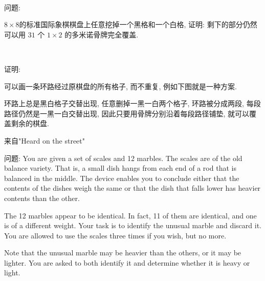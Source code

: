 ~

\noindent 问题:

$8\times 8$的标准国际象棋棋盘上任意挖掉一个黑格和一个白格, 证明: 剩下的部分仍然可以用 $ 31 $ 个 $ 1\times 2 $ 的多米诺骨牌完全覆盖.

~

\noindent 证明: 

可以画一条环路经过原棋盘的所有格子, 而不重复, 例如下图就是一种方案.
\begin{figure*}[htbp]
\centering
{}
\end{figure*}

环路上总是黑白格子交替出现, 任意删掉一黑一白两个格子, 环路被分成两段, 每段路径仍然是一黑一白交替出现, 因此只要用骨牌分别沿着每段路径铺垫, 就可以覆盖剩余的棋盘.


\newpage
\noindent 来自"Heard on the street"

\noindent 问题: You are given a set of scales and 12 marbles. The scales are of the old balance variety. That is, a small dish hangs from each end of a rod that is balanced in the middle. The device enables you to conclude either that the contents of the dishes weigh the same or that the dish that falls lower has heavier contents than the other.

The 12 marbles appear to be identical. In fact, 11 of them are identical, and one is of a different weight. Your task is to identify the unusual marble and discard it. You are allowed to use the scales three times if you wish, but no more.

Note that the unusual marble may be heavier than the others, or it may be lighter. You are asked to both identify it and determine whether it is heavy or light.

